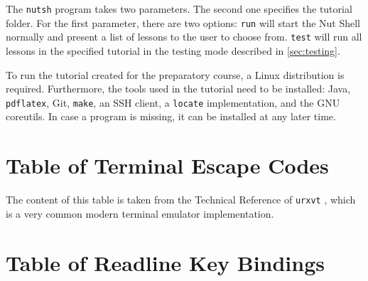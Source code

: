 \documentclass[paper=a4,twoside,abstract=on,cleardoublepage=empty,numbers=noenddot,toc=bib,toc=listof,12pt,appendixprefix=true]{scrreprt}
\begin{document}
The \texttt{nutsh} program takes two parameters. The second one specifies the tutorial folder. For the first parameter, there are two options: \texttt{run} will start the Nut Shell normally and present a list of lessons to the user to choose from. \texttt{test} will run all lessons in the specified tutorial in the testing mode described in \cref{sec:testing}.

To run the tutorial created for the preparatory course, a Linux distribution is required. Furthermore, the tools used in the tutorial need to be installed: Java, \texttt{pdflatex}, Git, \texttt{make}, an SSH client, a \texttt{locate} implementation, and the GNU coreutils. In case a program is missing, it can be installed at any later time.

\chapter{Table of Terminal Escape Codes}
\label{sec:esc}

The content of this table is taken from the Technical Reference of \texttt{urxvt} \cite{}, which is a very common modern terminal emulator implementation.


\chapter{Table of Readline Key Bindings}
\label{sec:keybindings}


\listoffigures
\listoftables

\nocite{why05}
\nocite{fowler10}
\nocite{upt02}
\nocite{dragonbook06}
\nocite{louden03}

%
\printbibliography
\end{document}
